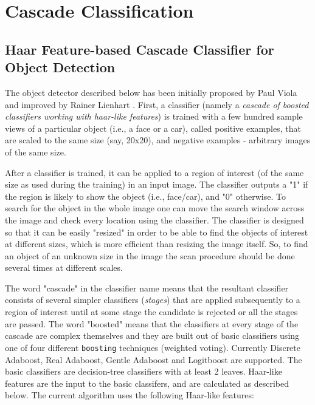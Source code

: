 \section{Cascade Classification}

\ifCPy

\subsection{Haar Feature-based Cascade Classifier for Object Detection}

The object detector described below has been initially proposed by Paul Viola
and improved by Rainer Lienhart
. First, a classifier (namely a \emph{cascade of boosted classifiers working with haar-like features}) is trained with a few hundred sample views of a particular object (i.e., a face or a car), called positive examples, that are scaled to the same size (say, 20x20), and negative examples - arbitrary images of the same size.

After a classifier is trained, it can be applied to a region of interest
(of the same size as used during the training) in an input image. The
classifier outputs a "1" if the region is likely to show the object
(i.e., face/car), and "0" otherwise. To search for the object in the
whole image one can move the search window across the image and check
every location using the classifier. The classifier is designed so that
it can be easily "resized" in order to be able to find the objects of
interest at different sizes, which is more efficient than resizing the
image itself. So, to find an object of an unknown size in the image the
scan procedure should be done several times at different scales.

The word "cascade" in the classifier name means that the resultant
classifier consists of several simpler classifiers (\emph{stages}) that
are applied subsequently to a region of interest until at some stage the
candidate is rejected or all the stages are passed. The word "boosted"
means that the classifiers at every stage of the cascade are complex
themselves and they are built out of basic classifiers using one of four
different \texttt{boosting} techniques (weighted voting). Currently
Discrete Adaboost, Real Adaboost, Gentle Adaboost and Logitboost are
supported. The basic classifiers are decision-tree classifiers with at
least 2 leaves. Haar-like features are the input to the basic classifers,
and are calculated as described below. The current algorithm uses the
following Haar-like features:

